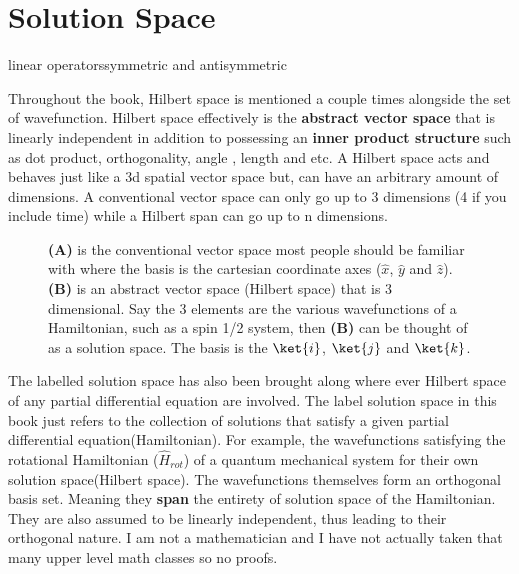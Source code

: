 \documentclass[11pt,a4paper]{book}
\newcommand{\imginput}[1]{} %
\begin{document}
	\section{Solution Space}
		\label{sec:Solution Space}
		linear operatorssymmetric and antisymmetric
		
		Throughout the book, Hilbert space is mentioned a couple times alongside the set of  wavefunction. Hilbert space effectively is the \textbf{abstract vector space} that is linearly independent in addition to possessing an \textbf{inner product structure} such as dot product, orthogonality, angle , length and etc. A Hilbert space acts and behaves just like a 3d spatial vector space but, can have an arbitrary amount of dimensions. A conventional vector space can only go up to 3 dimensions (4 if you include time) while a Hilbert span can go up to n dimensions.
		
		\begin{figure} [!ht]
			\centering
			\def\svgwidth{\columnwidth}
			\resizebox{160mm}{!}{\imginput{images/euclidean-hillbert.pdf_tex}}
			\caption{\textbf{(A)} is the conventional vector space most people should be familiar with where the basis is the cartesian coordinate axes ($\hat{x}$, $\hat{y}$ and  $\hat{z}$).\\
				\textbf{(B)} is an abstract vector space  (Hilbert space) that is 3 dimensional. Say the 3 elements are the various wavefunctions of a Hamiltonian, such as a spin 1/2 system, then \textbf{(B)} can be thought of as a solution space. The basis is the $\ket{i}$, $\ket{j}$ and $\ket{k}$.
			}
			\label{fig:cav-typaaaes}
		\end{figure}	
		
		The labelled solution space has also been brought along where ever Hilbert space of any partial differential equation are involved. The label solution space in this book just refers to the collection of solutions that satisfy a given partial differential equation(Hamiltonian). For example, the wavefunctions satisfying the rotational Hamiltonian ($\hat{H}_{rot}$) of a quantum mechanical system for their own solution space(Hilbert space). The wavefunctions themselves form an orthogonal basis set. Meaning they \textbf{span} the entirety of solution space of the Hamiltonian. They are also assumed to be linearly independent, thus leading to their orthogonal nature. I am not a mathematician and I have not actually taken that many upper level math classes so no proofs.
		
\end{document}
